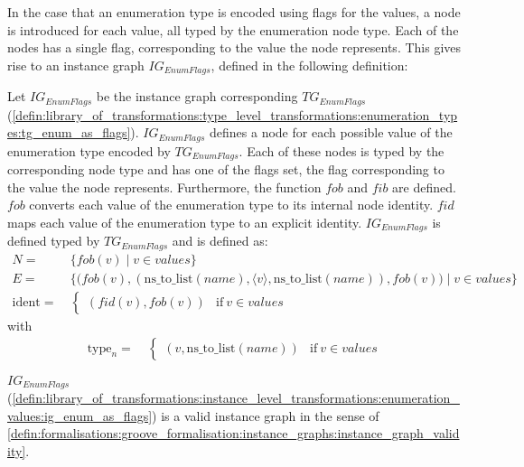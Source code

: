 In the case that an enumeration type is encoded using flags for the values, a node is introduced for each value, all typed by the enumeration node type. Each of the nodes has a single flag, corresponding to the value the node represents. This gives rise to an instance graph $IG_{EnumFlags}$, defined in the following definition:

\begin{defin}
\label{defin:library_of_transformations:instance_level_transformations:enumeration_values:ig_enum_as_flags}
Let $IG_{EnumFlags}$ be the instance graph corresponding $TG_{EnumFlags}$ (\cref{defin:library_of_transformations:type_level_transformations:enumeration_types:tg_enum_as_flags}). $IG_{EnumFlags}$ defines a node for each possible value of the enumeration type encoded by $TG_{EnumFlags}$. Each of these nodes is typed by the corresponding node type and has one of the flags set, the flag corresponding to the value the node represents. Furthermore, the function $fob$ and $fib$ are defined. $fob$ converts each value of the enumeration type to its internal node identity. $fid$ maps each value of the enumeration type to an explicit identity. $IG_{EnumFlags}$ is defined typed by $TG_{EnumFlags}$ and is defined as:
\begin{align*}
N =\ & \{fob(v) \mid v \in values \} \\
E =\ & \Big\{\Big(fob(v), (\mathrm{ns\_\!to\_\!list}(name), \langle v \rangle, \mathrm{ns\_\!to\_\!list}(name)), fob(v)\Big) \mid v \in values \Big\} \\
\mathrm{ident} =\ & \begin{cases}
    (fid(v), fob(v)) & \mathrm{if }\ v \in values
\end{cases}
\end{align*}
with
\begin{align*}
\mathrm{type}_n =\ & \begin{cases}
    (v, \mathrm{ns\_\!to\_\!list}(name)) & \mathrm{if }\ v \in values
\end{cases}
\end{align*}
\end{defin}

\begin{thm}
\label{defin:library_of_transformations:instance_level_transformations:enumeration_values:ig_enum_as_flags_correct}
$IG_{EnumFlags}$ (\cref{defin:library_of_transformations:instance_level_transformations:enumeration_values:ig_enum_as_flags}) is a valid instance graph in the sense of \cref{defin:formalisations:groove_formalisation:instance_graphs:instance_graph_validity}.
\end{thm}

